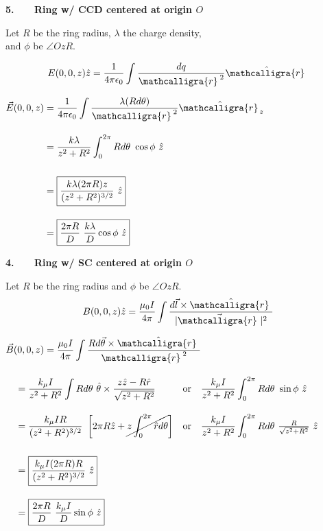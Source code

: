 \documentclass[12pt]{article}
\newcommand{\scripty}[1]{\ensuremath{\mathcalligra{#1}}}
\newcommand{\cursr}{\scripty{r}}		%
\newcommand{\cursrr}{\scripty{r}\ }
\newcommand{\hs}{\hspace{1pt}} %
\newcommand{\nhs}{\hspace{-1pt}} %
\begin{document}
\vspace{10pt}\noindent
\begin{minipage}[t]{.37\textwidth}
	\textbf{5. \ \ \ Ring w/ CCD centered at origin \(O\)}
	
	\vspace{10pt}
	Let \(R\) be the ring radius, \(\lambda\) the charge density, \\[7pt]
	and \(\phi\) be \(\angle OzR\).

	\vspace{5pt}
	\[ \displaystyle E(0,0,z) \hat{z} = \frac{1}{4 \pi \epsilon_0} \int \frac{dq}{\cursr^{\hs\hs 2}} \hat{\cursrr}\]

	\vspace{10pt}
	\(\begin{aligned}
		\vec{E}(0,0,z) &= \frac{1}{4 \pi \epsilon_0} \int \frac{\lambda (R d\theta)}{\cursr^{\hs\hs 2}} \hat{\cursrr}_{\nhs\nhs z}\\[10pt]
		&= \frac{k \lambda}{z^2 + R^2} \int_0^{2\pi} Rd\theta\ \cos{\phi}\ \hat{z} \\[15pt]
		&= \boxed{ \frac{k \lambda (2\pi R) z}{(z^2 + R^2)^{3/2}}\ \hat{z} }\\[10pt]
		&= \boxed{ \frac{2\pi R}{D}\ \frac{k \lambda}{D} \cos{\phi}\ \hat{z}}
	\end{aligned}\)
\end{minipage}
\hfill\vline\hfill
\begin{minipage}[t]{.57\textwidth}
	\textbf{4. \ \ \ Ring w/ SC centered at origin \(O\)}

	\vspace{10pt}
	Let \(R\) be the ring radius and \(\phi\) be \(\angle OzR\).
	\[ \displaystyle B(0,0,z) \hat{z} = \frac{\mu_0 I}{4 \pi} 
			\int \frac{ d\vec{l} \times \hat{\cursrr} }{| \vec{\cursrr} |^2} \]

	\vspace{5pt}
	\(\begin{aligned} 
		&\vec{B}(0,0,z) = \frac{\mu_0 I}{4 \pi} \int \frac{R d\vec{\theta} \times \hat{\cursrr}}{\cursr^{\hs\hs 2}}\\[10pt]
		&\ \ \ \begin{aligned}
			&= \frac{k_\mu I}{z^2 + R^2} \int R d\theta \ \hat{\theta} \times \frac{z\hat{z}-R\hat{r}}{\sqrt{z^2 + R^2}} 
				&&\text{or}\quad 
				\frac{k_\mu I}{z^2 + R^2} \int_0^{2\pi} R d\theta \ \sin{\phi}\ \hat{z}\\[10pt]
			&= \frac{k_\mu I R}{ (z^2 + R^2)^{3/2} } \ 
				\left[ 2 \pi R \hat{z} + \cancel{z \int_0^{2 \pi} \hat{r} d\theta} \right] 
				&&\text{or}\quad 
				\frac{k_\mu I}{z^2 + R^2} \int_0^{2\pi} R d\theta \ \tfrac{R}{\sqrt{z^2 + R^2}}\ \hat{z}\\[15pt]
			&= \boxed{ \frac{k_\mu I(2\pi R)R}{ (z^2 + R^2)^{3/2} } \ \hat{z} }\\[10pt]
			&= \boxed{ \frac{2\pi R}{D}\ \frac{k_\mu I}{D} \sin{\phi}\ \hat{z} }
		\end{aligned}
	\end{aligned}\)
\end{minipage}
\end{document}
